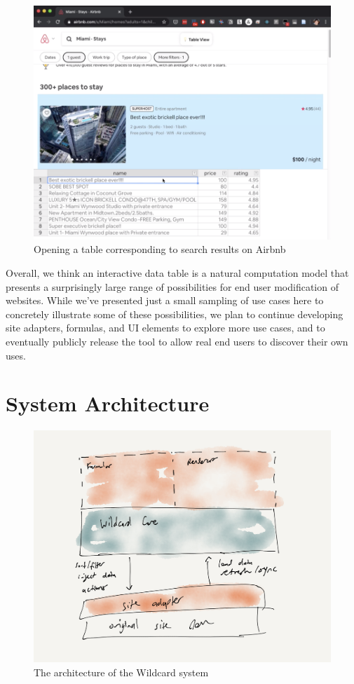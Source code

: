 \documentclass[english,submission]{programming}
\begin{document}
\begin{figure}
\hypertarget{fig:table}{%
\centering
\includegraphics{media/opentable.png}
\caption{Opening a table corresponding to search results on
Airbnb}\label{fig:table}
}
\end{figure}

Overall, we think an interactive data table is a natural computation
model that presents a surprisingly large range of possibilities for end
user modification of websites. While we've presented just a small
sampling of use cases here to concretely illustrate some of these
possibilities, we plan to continue developing site adapters, formulas,
and UI elements to explore more use cases, and to eventually publicly
release the tool to allow real end users to discover their own uses.

\hypertarget{system-architecture}{%
\section{System Architecture}\label{system-architecture}}

\begin{figure}
\centering
\includegraphics{media/architecture.png}
\caption{The architecture of the Wildcard system}
\end{figure}
\end{document}
